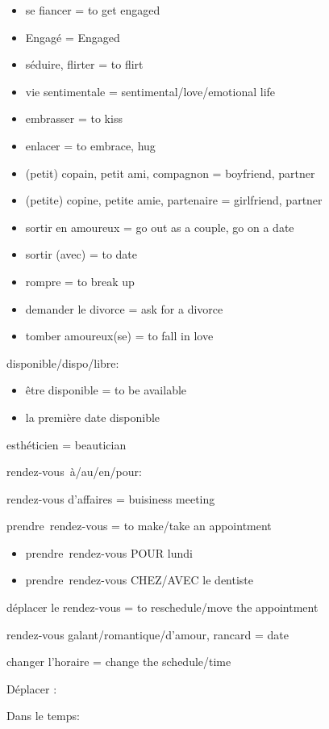 \begin{itemize}
\item
  se fiancer = to get engaged
\item
  Engagé = Engaged
\item
  séduire, flirter = to flirt
\item
  vie sentimentale = sentimental/love/emotional life
\item
  embrasser = to kiss
\item
  {enlacer} = to embrace, hug
\item
  (petit) copain, petit ami, compagnon = boyfriend, partner
\item
  (petite) copine, petite amie, partenaire = girlfriend, partner
\item
  sortir en amoureux = go out as a couple, go on a date
\item
  sortir (avec) = to date
\item
  rompre = to break up
\item
  demander {le} divorce = ask for a divorce
\item
  tomber amoureux(se) = to fall in love
\end{itemize}

disponible/dispo/libre:

\begin{itemize}
\item
  être disponible = to be available
\item
  la première date disponible
\end{itemize}

esthéticien = beautician

rendez-vous~à/au/en/pour:

rendez-vous d'affaires = buisiness meeting

prendre~rendez-vous = to make/take an appointment~

\begin{itemize}
\item
  {prendre~rendez-vous POUR lundi}
\item
  {prendre~rendez-vous CHEZ/AVEC le dentiste}
\end{itemize}

{déplacer} le rendez-vous = to reschedule/move the appointment

rendez-vous galant/romantique/d'amour, rancard = date

{changer} l'horaire = change the schedule/time

Déplacer :

Dans le temps:

